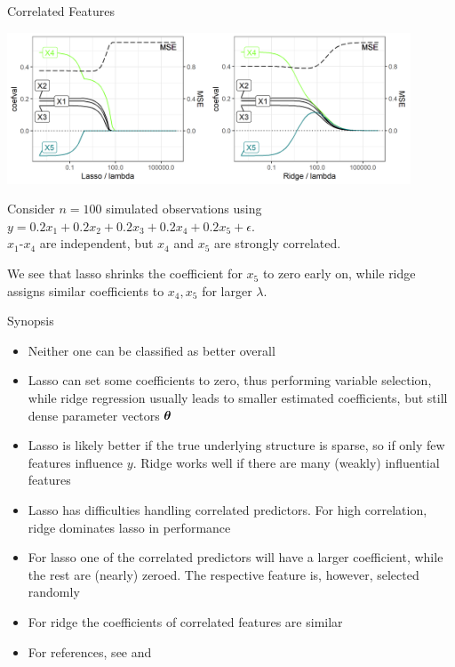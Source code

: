 \documentclass[11pt,compress,t,notes=noshow, xcolor=table]{beamer}
\begin{document}
\begin{vbframe}{Correlated Features}


\includegraphics[width=0.9\textwidth]{figure/regu_example_multicollinearity.png}

Consider $n=100$ simulated observations using $y = 0.2x_1 + 0.2x_2 + 0.2x_3 + 0.2x_4 + 0.2x_5 + \epsilon$.\\
$x_1$-$x_4$ are independent, but $x_4$ and $x_5$ are strongly correlated.

\vspace{0.1cm}

We see that lasso shrinks the coefficient for $x_5$ to zero early on, while ridge assigns similar coefficients to $x_4, x_5$ for larger $\lambda$.

\end{vbframe}


\begin{vbframe}{Synopsis}

\begin{itemize}
\item Neither one can be classified as better overall
\item Lasso can set some coefficients to zero, thus performing variable selection, while ridge regression usually leads to smaller estimated coefficients, but still dense parameter vectors $\bm{\theta}$
\item Lasso is likely better if the true underlying structure is sparse, so if only few features influence $y$. Ridge works well if there are many (weakly) influential features
\item Lasso has difficulties handling correlated predictors. For high correlation, ridge dominates lasso in performance
\item For lasso one of the correlated predictors will have a larger coefficient, while the rest are (nearly) zeroed. The respective feature is, however, selected randomly
\item For ridge the coefficients of correlated features are similar
\item For references, see  and 
\end{itemize}

\end{vbframe}

\endlecture
\end{document}
